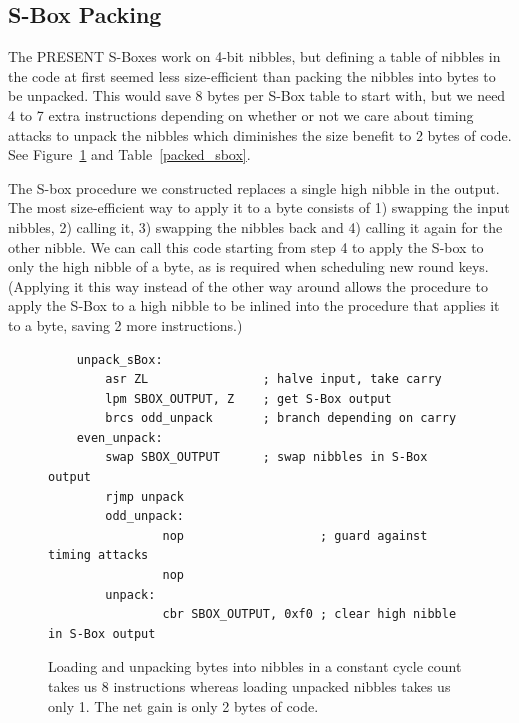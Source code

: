 \documentclass[11pt]{llncs2e} %
\begin{document}
\subsection{S-Box Packing}\label{sbox_packing}
The PRESENT S-Boxes work on 4-bit nibbles, but defining a table of nibbles in the code at first seemed less size-efficient than packing the nibbles into bytes to be unpacked.
This would save 8 bytes per S-Box table to start with, but we need 4 to 7 extra instructions depending on whether or not we care about timing attacks to unpack the nibbles which diminishes the size benefit to 2 bytes of code. See Figure~\ref{unpacking_code} and Table~\ref{packed_sbox}.

The S-box procedure we constructed replaces a single high nibble in the output.
The most size-efficient way to apply it to a byte consists of 1) swapping the input nibbles, 2) calling it, 3) swapping the nibbles back and 4) calling it again for the other nibble.
We can call this code starting from step 4 to apply the S-box to only the high nibble of a byte, as is required when scheduling new round keys.
(Applying it this way instead of the other way around allows the procedure to apply the S-Box to a high nibble to be inlined into the procedure that applies it to a byte, saving 2 more instructions.)

\begin{figure}[H]
\centering
\begin{lstlisting}
	unpack_sBox:
		asr ZL                ; halve input, take carry
		lpm SBOX_OUTPUT, Z    ; get S-Box output
		brcs odd_unpack       ; branch depending on carry
	even_unpack:
		swap SBOX_OUTPUT      ; swap nibbles in S-Box output
		rjmp unpack
        odd_unpack:
                nop                   ; guard against timing attacks
                nop
        unpack:
                cbr SBOX_OUTPUT, 0xf0 ; clear high nibble in S-Box output
	\end{lstlisting}
	\caption{\footnotesize Loading and unpacking bytes into nibbles in a constant cycle count takes us 8 instructions whereas loading unpacked nibbles takes us only 1. The net gain is only 2 bytes of code.}
\label{unpacking_code}
\end{figure}
\end{document}
